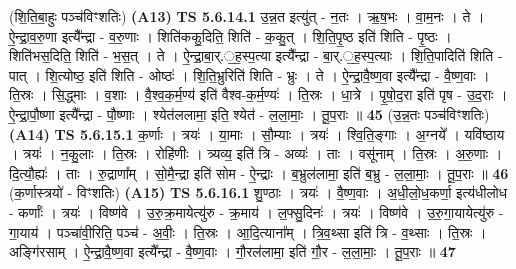 \documentclass[17pt]{extarticle}
\begin{document}
                  \newline
                      (शि॒ति॒बा॒हुः पञ्च॑विꣳशतिः)  \textbf{(A13)} \newline \newline
                                \textbf{ TS 5.6.14.1} \newline
                  उ॒न्न॒त इत्यु॑त् - न॒तः । ऋ॒ष॒भः । वा॒म॒नः । ते । ऐ॒न्द्रा॒व॒रु॒णा इत्यै᳚न्द्रा - व॒रु॒णाः । शिति॑ककु॒दिति॒ शिति॑ - क॒कु॒त् । शि॒ति॒पृ॒ष्ठ इति॑ शिति - पृ॒ष्ठः । शिति॑भस॒दिति॒ शिति॑ - भ॒स॒त् । ते । ऐ॒न्द्रा॒बा॒र्.॒ह॒स्प॒त्या इत्यै᳚न्द्रा - बा॒र्.॒ह॒स्प॒त्याः । शि॒ति॒पादिति॑ शिति - पात् । शि॒त्योष्ठ॒ इति॑ शिति - ओष्ठः॑ । शि॒ति॒भ्रुरिति॑ शिति - भ्रुः । ते । ऐ॒न्द्रा॒वै॒ष्ण॒वा इत्यै᳚न्द्रा - वै॒ष्ण॒वाः । ति॒स्रः । सि॒द्ध्माः । व॒शाः । वै॒श्व॒क॒र्म॒ण्य॑ इति॑ वैश्व-क॒र्म॒ण्यः॑ । ति॒स्रः । धा॒त्रे । पृ॒षो॒द॒रा इति॑ पृष - उ॒द॒राः । ऐ॒न्द्रा॒पौ॒ष्णा इत्यै᳚न्द्रा - पौ॒ष्णाः । श्येत॑ललामा॒ इति॒ श्येत॑ - ल॒ला॒माः॒ । तू॒प॒राः ॥ \textbf{  45 } \newline
                  \newline
                      (उ॒न्न॒तः पञ्च॑विꣳशतिः)  \textbf{(A14)} \newline \newline
                                \textbf{ TS 5.6.15.1} \newline
                  क॒र्णाः । त्रयः॑ । या॒माः । सौ॒म्याः । त्रयः॑ । श्वि॒ति॒ङ्गाः । अ॒ग्नये᳚ । यवि॑ष्ठाय । त्रयः॑ । न॒कु॒लाः । ति॒स्रः । रोहि॑णीः । त्र्यव्य॒ इति॑ त्रि - अव्यः॑ । ताः । वसू॑नाम् । ति॒स्रः । अ॒रु॒णाः । दि॒त्यौ॒ह्यः॑ । ताः । रु॒द्राणा᳚म् । सो॒मै॒न्द्रा इति॑ सोम - ऐ॒न्द्राः । ब॒भ्रुल॑लामा॒ इति॑ ब॒भ्रु - ल॒ला॒माः॒ । तू॒प॒राः ॥ \textbf{  46} \newline
                  \newline
                      (क॒र्णास्त्रयो॑ - विꣳशतिः)  \textbf{(A15)} \newline \newline
                                \textbf{ TS 5.6.16.1} \newline
                  शु॒ण्ठाः । त्रयः॑ । वै॒ष्ण॒वाः । अ॒धी॒लो॒ध॒कर्णा॒ इत्य॑धीलोध - कर्णाः᳚ । त्रयः॑ । विष्ण॑वे । उ॒रु॒क्र॒मायेत्यु॑रु - क्र॒माय॑ । ल॒फ्सु॒दिनः॑ । त्रयः॑ । विष्ण॑वे । उ॒रु॒गा॒यायेत्यु॑रु - गा॒याय॑ । पञ्चा॑वी॒रिति॒ पञ्च॑ - अ॒वीः॒ । ति॒स्रः । आ॒दि॒त्याना᳚म् । त्रि॒व॒थ्सा इति॑ त्रि - व॒थ्साः । ति॒स्रः । अङ्गि॑रसाम् । ऐ॒न्द्रा॒वै॒ष्ण॒वा इत्यै᳚न्द्रा - वै॒ष्ण॒वाः । गौ॒रल॑लामा॒ इति॑ गौ॒र - ल॒ला॒माः॒ । तू॒प॒राः ॥ \textbf{  47} \newline
                  \newline
\end{document}
